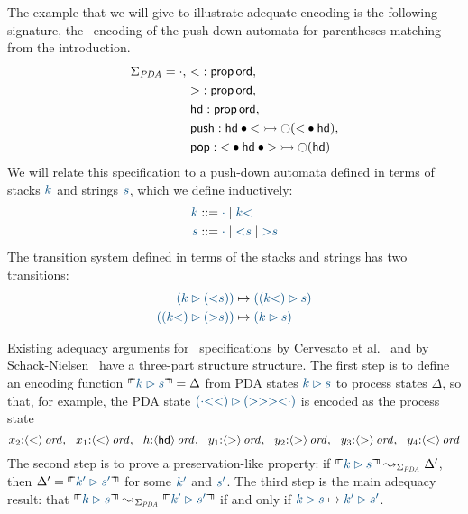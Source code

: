 The example that we will give to illustrate adequate encoding is the
following signature, the \sls~encoding of the push-down automata 
for parentheses matching from the introduction. 
\begin{align*}
 \Sigma_{\it PDA} = \cdot, 
~&{\sf <} : {\sf prop}\,{\sf ord},\\
~&{\sf >} : {\sf prop}\,{\sf ord},\\
~&{\sf hd} : {\sf prop}\,{\sf ord},\\
~&{\sf push} : 
     {\sf hd} \mathbin{\bullet} {\sf <}
       \rightarrowtail {\ocircle}({\sf <} \mathbin{\bullet} {\sf hd}),\\
~&{\sf pop} : 
     {\sf <} \mathbin{\bullet} {\sf hd} \mathbin{\bullet} {\sf >}
       \rightarrowtail {\ocircle}({\sf hd})
\end{align*}
We will relate this specification to a push-down automata defined in
terms of stacks $\obj{k}$ and strings $\obj{s}$, which we define inductively:
\begin{align*}
\obj{k} & ::= \obj{\cdot} \mid \obj{k{\sf <}}\\
\obj{s} & ::= \obj{\cdot} \mid \obj{{\sf <}s} \mid \obj{{\sf >}s}
\end{align*}
The transition system defined in terms of the stacks and strings
has two transitions:
\begin{align*}
\obj{(k
  \rhd ({\sf <}s))} & \mapsto \obj{((k{\sf <}) \rhd s)} \\
\obj{((k{\sf <}) \rhd ({\sf >}s))} & \mapsto \obj{(k \rhd s)}
\end{align*}

Existing adequacy arguments for \sls~specifications by Cervesato et
al.~\cite{cervesato02concurrent} and by
Schack-Nielsen~\cite{schacknielsen07induction} have a three-part
structure structure.  The first step is to define an encoding
function $\ctxinterp{k \rhd s} = \Delta$ from PDA states $\obj{k \rhd
  s}$ to process states $\Delta$, so that, for example, the PDA state
$\obj{(\cdot{\sf <<}) \rhd ({\sf >>><}\cdot)}$ is encoded as the
process state
\[
x_2{:}{\langle {\sf <} \rangle}\,{{\it ord}}, ~~
x_1{:}{\langle {\sf <} \rangle}\,{{\it ord}}, ~~
h{:}{\langle {\sf hd} \rangle}\,{{\it ord}}, ~~
y_1{:}{\langle {\sf >} \rangle}\,{{\it ord}}, ~~
y_2{:}{\langle {\sf >} \rangle}\,{{\it ord}}, ~~
y_3{:}{\langle {\sf >} \rangle}\,{{\it ord}}, ~~
y_4{:}{\langle {\sf <} \rangle}\,{{\it ord}}
\]
The second step is to prove a preservation-like property: if
$\ctxinterp{\obj{k \rhd s}} \leadsto_{\Sigma_{\it PDA}}
\Delta'$, then $\Delta' = \ctxinterp{{k' \rhd s'}}$ for some
$\obj{k'}$ and $\obj{s'}$. The third step is the main adequacy result:
that $\ctxinterp{k \rhd s} \leadsto_{\Sigma_{\it PDA}} \ctxinterp{k'
  \rhd s'}$ if and only if $\obj{k \rhd s} \mapsto \obj{k' \rhd
  s'}$. 


